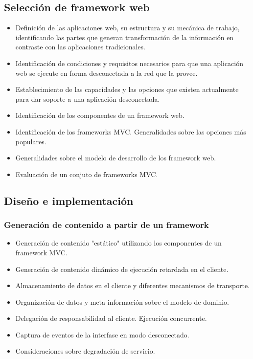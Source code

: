 \documentclass[a4paper]{report}
\begin{document}
\subsection{Selección de framework web}
\begin{itemize}
  \item Definición de las aplicaciones web, su estructura y su mecánica de
  trabajo, identificando las partes que generan transformación 
  de la información en contraste con las aplicaciones tradicionales.
  \item Identificación de condiciones y requisitos necesarios para que una
  aplicación web se ejecute en forma desconectada a la red que la provee.
  \item Establecimiento de las capacidades y las opciones que existen
  actualmente para dar soporte a una aplicación desconectada.
  \item Identificación de los componentes de un framework web.
  \item Identificación de los frameworks MVC. Generalidades sobre las opciones
  más populares.
  \item Generalidades sobre el modelo de desarrollo de los framework web.
  \item Evaluación de un conjuto de frameworks MVC.
\end{itemize}

\subsection{Diseño e implementación}
	
\subsubsection{Generación de contenido a partir de un framework}
	
\begin{itemize}
	\item Generación de contenido "estático" utilizando los componentes de un framework MVC.
	\item Generación de contenido dinámico de ejecución retardada en el cliente.
	\item Almacenamiento de datos en el cliente y diferentes mecanismos de
	transporte.
	\item Organización de datos y meta información sobre el modelo de dominio.
	\item Delegación de responsabilidad al cliente. Ejecución concurrente.
	\item Captura de eventos de la interfase en modo desconectado.
	\item Consideraciones sobre degradación de servicio.
\end{itemize}            
            
\end{document}
